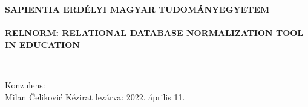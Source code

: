 \newpage
{}
\linespread{1}

\begin{center}
    {\bfseries
    \vspace*{1.5cm}
    \large{SAPIENTIA ERDÉLYI MAGYAR TUDOMÁNYEGYETEM} \\\vspace{2.5cm}
    \large{\@title} \\ \vspace{1.5cm}
    \large{RELNORM: RELATIONAL DATABASE NORMALIZATION TOOL IN EDUCATION} \\ \vspace{2cm}
    }
    \large{
    \@author \\ \vspace{2cm}
    
    Konzulens: \\
    Milan Čeliković
    \vfill
    Kézirat lezárva: 2022. április 11.
    }
\end{center}
